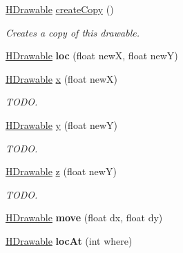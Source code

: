 \begin{DoxyCompactItemize}
\item 
\hyperlink{classhype_1_1drawable_1_1_h_drawable}{H\-Drawable} \hyperlink{classhype_1_1drawable_1_1_h_stage_aa7e644b2063eda66b2860a8d60ba124f}{create\-Copy} ()
\begin{DoxyCompactList}\small\item\em Creates a copy of this drawable. \end{DoxyCompactList}\item 
\hypertarget{classhype_1_1drawable_1_1_h_stage_a1c85e616f556722f523819b59b6b7661}{\hyperlink{classhype_1_1drawable_1_1_h_drawable}{H\-Drawable} {\bfseries loc} (float new\-X, float new\-Y)}\label{classhype_1_1drawable_1_1_h_stage_a1c85e616f556722f523819b59b6b7661}

\item 
\hyperlink{classhype_1_1drawable_1_1_h_drawable}{H\-Drawable} \hyperlink{classhype_1_1drawable_1_1_h_stage_a28aabd3bca1fdabfa092ebe3c7c3a82d}{x} (float new\-X)
\begin{DoxyCompactList}\small\item\em T\-O\-D\-O. \end{DoxyCompactList}\item 
\hyperlink{classhype_1_1drawable_1_1_h_drawable}{H\-Drawable} \hyperlink{classhype_1_1drawable_1_1_h_stage_a0cb3ba260c10dc0795441102e575dc7c}{y} (float new\-Y)
\begin{DoxyCompactList}\small\item\em T\-O\-D\-O. \end{DoxyCompactList}\item 
\hyperlink{classhype_1_1drawable_1_1_h_drawable}{H\-Drawable} \hyperlink{classhype_1_1drawable_1_1_h_stage_a11bc569898118ace4345b069c3e32029}{z} (float new\-Y)
\begin{DoxyCompactList}\small\item\em T\-O\-D\-O. \end{DoxyCompactList}\item 
\hypertarget{classhype_1_1drawable_1_1_h_stage_ab6865d98aa10cebe8ce6915e9984da7d}{\hyperlink{classhype_1_1drawable_1_1_h_drawable}{H\-Drawable} {\bfseries move} (float dx, float dy)}\label{classhype_1_1drawable_1_1_h_stage_ab6865d98aa10cebe8ce6915e9984da7d}

\item 
\hypertarget{classhype_1_1drawable_1_1_h_stage_aa9a71e52b085ef8ee467d7cd801ce2ed}{\hyperlink{classhype_1_1drawable_1_1_h_drawable}{H\-Drawable} {\bfseries loc\-At} (int where)}\label{classhype_1_1drawable_1_1_h_stage_aa9a71e52b085ef8ee467d7cd801ce2ed}


\end{DoxyCompactItemize}
